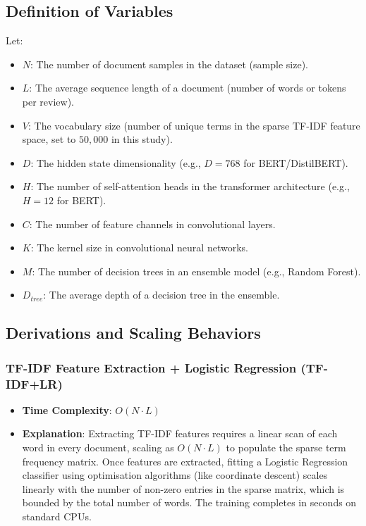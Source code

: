 \documentclass[11pt]{article}
\begin{document}
\subsection{Definition of Variables}
Let:
\begin{itemize}
    \item $N$: The number of document samples in the dataset (sample size).
    \item $L$: The average sequence length of a document (number of words or tokens per review).
    \item $V$: The vocabulary size (number of unique terms in the sparse TF-IDF feature space, set to $50,000$ in this study).
    \item $D$: The hidden state dimensionality (e.g., $D = 768$ for BERT/DistilBERT).
    \item $H$: The number of self-attention heads in the transformer architecture (e.g., $H = 12$ for BERT).
    \item $C$: The number of feature channels in convolutional layers.
    \item $K$: The kernel size in convolutional neural networks.
    \item $M$: The number of decision trees in an ensemble model (e.g., Random Forest).
    \item $D_{tree}$: The average depth of a decision tree in the ensemble.
\end{itemize}

\subsection{Derivations and Scaling Behaviors}

\subsubsection{TF-IDF Feature Extraction + Logistic Regression (TF-IDF+LR)}
\begin{itemize}
    \item \textbf{Time Complexity}: $O(N \cdot L)$
    \item \textbf{Explanation}: Extracting TF-IDF features requires a linear scan of each word in every document, scaling as $O(N \cdot L)$ to populate the sparse term frequency matrix. Once features are extracted, fitting a Logistic Regression classifier using optimisation algorithms (like coordinate descent) scales linearly with the number of non-zero entries in the sparse matrix, which is bounded by the total number of words. The training completes in seconds on standard CPUs.
\end{itemize}
\end{document}
